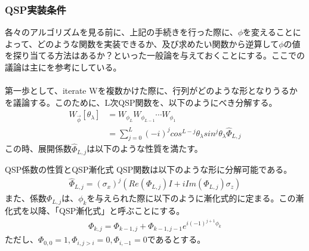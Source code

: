 \documentclass[a4paper,10.5pt]{article}
\numberwithin{equation}{section}
\begin{document}
\subsubsection{QSP実装条件}
各々のアルゴリズムを見る前に、上記の手続きを行った際に、$\phi$を変えることによって、どのような関数を実装できるか、及び求めたい関数から逆算して$\phi$の値を探り当てる方法はあるか？といった一般論を与えておくことにする。ここでの議論は主に\cite{Low:2016znh}を参考にしている。\\
\\
第一歩として、iterate Wを複数かけた際に、行列がどのような形となりうるかを議論する。このために、L次QSP関数を、以下のようにべき分解する。
\begin{align*}
    W_{\vec{\phi}}[\theta_{\lambda}]&=W_{\phi_{L}}W_{\phi_{L-1}}\cdots W_{\phi_{1}}\\
    &=\sum_{j=0}^{L}(-i)^{j}cos^{L-j}\theta_{\lambda}sin^{j}\theta_{\lambda}\hat{\Phi}_{L,j}
\end{align*}
この時、展開係数$\hat{\Phi}_{L,j}$は以下のような性質を満たす。
\begin{resultbox}{QSP係数の性質とQSP漸化式}
QSP関数は以下のような形に分解可能である。
\begin{align*}
    \hat{\Phi}_{L,j}=(\sigma_{x})^{j}(Re(\Phi_{L,j})I+iIm(\Phi_{L,j})\sigma_{z})
\end{align*}
また、係数$\Phi_{L,j}$は、$\phi_{k}$を与えられた際に以下のように漸化式的に定まる。この漸化式を以降、「QSP漸化式」と呼ぶことにする。
\begin{align*}
    \Phi_{k,j}=\Phi_{k-1,j}+\Phi_{k-1,j-1}e^{i(-1)^{j+1}\phi_{k}}
\end{align*}
ただし、$\Phi_{0,0}=1,\Phi_{i,j>i}=0,\Phi_{i,-1}=0$であるとする。
\end{resultbox}
\end{document}
